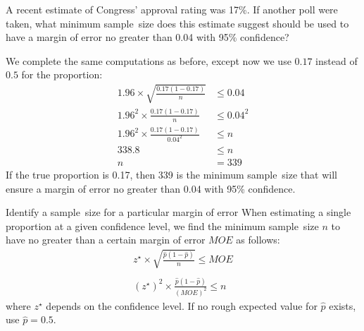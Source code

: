 \begin{examplewrap}
\begin{nexample}{A recent estimate of Congress' approval rating was 17\%.
    If another poll were taken, what minimum sample~size does this estimate
    suggest should be used to have a margin of error no greater than 0.04
    with 95\% confidence?}

We complete the same computations as before, except now we use $0.17$ instead of $0.5$ for the proportion:
\begin{align*}
1.96\times \sqrt{\frac{0.17(1-0.17)}{n}} &\leq 0.04\\
	1.96^2\times \frac{0.17(1-0.17)}{n} &\leq 0.04^2 \\
	1.96^2\times \frac{0.17(1-0.17)}{0.04^2} &\leq n \\
338.8 &\leq n\\
n &= 339
\end{align*}
If the true proportion is 0.17, then 339 is the minimum sample~size that will ensure a margin of error no greater than 0.04 with 95\% confidence.


\end{nexample}
\end{examplewrap}

\begin{onebox}{Identify a sample~size for a particular margin of error}
When estimating a single proportion at a given confidence level, we find the minimum \mbox{sample~size} $n$ to have no greater than a certain margin of error $MOE$ as follows:
\begin{align*}
z^{\star}\times \sqrt{\frac{\hat{p}(1-\hat{p})}{n}} \leq MOE\\ \\
(z^{\star})^2\times \frac{\hat{p}(1-\hat{p})}{(MOE)^2} \leq n
\end{align*}
where $z^{\star}$ depends on the confidence level.   If no rough expected value for $\hat{p}$ exists, use $\hat{p} = 0.5$.  	
\end{onebox}


